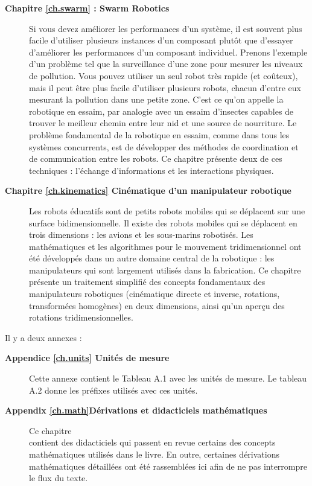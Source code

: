 \begin{description}
\smallskip
\item [\textbf{Chapitre \ref{ch.swarm} : Swarm Robotics}] Si vous devez améliorer les performances d'un système, il est souvent plus facile d'utiliser plusieurs instances d'un composant plutôt que d'essayer d'améliorer les performances d'un composant individuel. Prenons l'exemple d'un problème tel que la surveillance d'une zone pour mesurer les niveaux de pollution. Vous pouvez utiliser un seul robot très rapide (et coûteux), mais il peut être plus facile d'utiliser plusieurs robots, chacun d'entre eux mesurant la pollution dans une petite zone. C'est ce qu'on appelle la robotique en essaim, par analogie avec un essaim d'insectes capables de trouver le meilleur chemin entre leur nid et une source de nourriture. Le problème fondamental de la robotique en essaim, comme dans tous les systèmes concurrents, est de développer des méthodes de coordination et de communication entre les robots. Ce chapitre présente deux de ces techniques : l'échange d'informations et les interactions physiques.
\smallskip
\item [\textbf{Chapitre \ref{ch.kinematics} Cinématique d'un manipulateur robotique}] Les robots éducatifs sont de petits robots mobiles qui se déplacent sur une surface bidimensionnelle. Il existe des robots mobiles qui se déplacent en trois dimensions : les avions et les sous-marins robotisés. Les mathématiques et les algorithmes pour le mouvement tridimensionnel ont été développés dans un autre domaine central de la robotique : les manipulateurs qui sont largement utilisés dans la fabrication. Ce chapitre présente un traitement simplifié des concepts fondamentaux des manipulateurs robotiques (cinématique directe et inverse, rotations, transformées homogènes) en deux dimensions, ainsi qu'un aperçu des rotations tridimensionnelles.
\end{description}

Il y a deux annexes :
\begin{description}
\item [\textbf{Appendice \ref{ch.units} Unités de mesure}] Cette annexe contient le Tableau A.1 avec les unités de mesure. Le tableau A.2 donne les préfixes utilisés avec ces unités.
\smallskip
\item [\textbf{Appendix \ref{ch.math}Dérivations et didacticiels mathématiques}] Ce chapitre\\
contient des didacticiels qui passent en revue certains des concepts mathématiques utilisés dans le livre. En outre, certaines dérivations mathématiques détaillées ont été rassemblées ici afin de ne pas interrompre le flux du texte.
\end{description}


